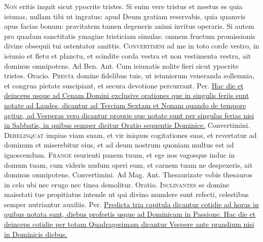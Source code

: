 \begin{multicols*}{2}
\lettrine[lines=2]{\zallmancaps \color{Blue} N}{on} eritis inquit sicut ypocrite tristes. Si enim vere tristus et mestus es quia ieiunas, nullam tibi ut ingratus: apud Deum gratiam reservabis, quia quamvis opus facias bonum: pravitatem tamen degeneris animi invitus operaris. Si autem pro quadam sanctitatis ymagine tristiciam simulas: omnem fructum promissionis divine obsequii tui ostentator amittis.
\lettrine[lines=2]{\zallmancaps \color{Red} C}{onvertimini} ad me in toto corde vestro, in ieiunio et fletu et planctu, et scindite corda vestra et non vestimenta vestra, ait dominus omnipotens. {\color{Red} Ad Ben. Ant.} Cum ieiunatis nolite fieri sicut ypocrite tristes. {\color{Red} Oracio.}
\lettrine[lines=2]{\zallmancaps \color{Blue} P}{resta} domine fidelibus tuis, ut ieiuniorum veneranda sollemnia, et congrua pietate suscipiant, et secura devotione percurrant. Per.
\newline \ul{Hac die et deinceps usque ad Cenam Domini exclusive orationes que in singulis feriis sunt notate ad Laudes, dicantur ad Terciam Sextam et Nonam quando de tempore agitur, ad Vesperas vero dicantur proprie que notate sunt per singulas ferias nisi in Sabbatis, in quibus semper dicitur Oratio sequentis Dominice.}
 Convertimini.
\lettrine[lines=2]{\zallmancaps \color{Red} D}{erelinquat} impius viam suam, et vir iniquus cogitationes suas, et revertatur ad dominum et miserebitur eius, et ad deum nostrum quoniam multus est ad ignoscendum.
\lettrine[lines=2]{\zallmancaps \color{Blue} F}{range} esurienti panem tuum, et ege nos vagosque induc in domum tuam, cum videris nudum operi eum, et carnem tuam ne despexeris, ait dominus omnipotens.
 Convertimini. {\color{Red} Ad Mag. Ant.} Thesaurizate vobis thesauros in celo ubi nec erugo nec tinea demolitur. {\color{Red} Oratio.}
\lettrine[lines=2]{\zallmancaps \color{Red} I}{nclinantes} se domine maiestati tue propitiatus intende ut qui divino mundere sunt refecti, celestibus semper nutriantur auxiliis. Per.
\newline \ul{Predicta tria capitula dicantur cotidie ad horas in quibus notata sunt, diebus profestis usque ad Dominicam in Passione. Hac die et deinceps cotidie per totam Quadragesimam dicantur Vespere ante prandium nisi in Dominicis diebus.}

\end{multicols*}
